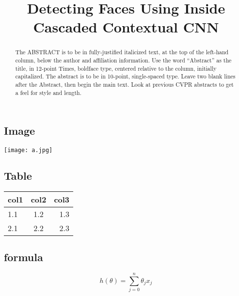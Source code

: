 \documentclass[10pt,twocolumn,letterpaper]{article}
\begin{document}
\title{Detecting Faces Using Inside Cascaded Contextual CNN}


\maketitle

\begin{abstract}
   The ABSTRACT is to be in fully-justified italicized text, at the top
   of the left-hand column, below the author and affiliation
   information. Use the word ``Abstract'' as the title, in 12-point
   Times, boldface type, centered relative to the column, initially
   capitalized. The abstract is to be in 10-point, single-spaced type.
   Leave two blank lines after the Abstract, then begin the main text.
   Look at previous CVPR abstracts to get a feel for style and length.
\end{abstract}

\subsection{Image}
\texttt{[image: a.jpg]}

\subsection{Table}
\begin{tabular}{|l|c|r|}
\hline
col1 & col2 & col3\\
\hline
1.1 & 1.2 & 1.3\\
\hline
2.1 & 2.2 & 2.3 \\
\hline
\end{tabular}

\subsection{formula}
$$h(\theta) = \sum_{j = 0} ^n \theta_j x_j$$
\end{document}
